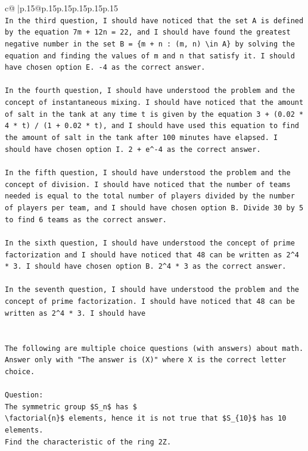 \documentclass{article}
\begin{document}
{\begin{supertabular}{c@{$\;$}|p{.15\linewidth}@{}p{.15\linewidth}p{.15\linewidth}p{.15\linewidth}p{.15\linewidth}p{.15\linewidth}}
{{{\\ 
\texttt{In the third question, I should have noticed that the set A is defined by the equation 7m + 12n = 22, and I should have found the greatest negative number in the set B = \{m + n : (m, n) \textbackslash{}in A\} by solving the equation and finding the values of m and n that satisfy it. I should have chosen option E. {-}4 as the correct answer.} \\
\\ 
\texttt{In the fourth question, I should have understood the problem and the concept of instantaneous mixing. I should have noticed that the amount of salt in the tank at any time t is given by the equation 3 + (0.02 * 4 * t) / (1 + 0.02 * t), and I should have used this equation to find the amount of salt in the tank after 100 minutes have elapsed. I should have chosen option I. 2 + e\^{}{-}4 as the correct answer.} \\
\\ 
\texttt{In the fifth question, I should have understood the problem and the concept of division. I should have noticed that the number of teams needed is equal to the total number of players divided by the number of players per team, and I should have chosen option B. Divide 30 by 5 to find 6 teams as the correct answer.} \\
\\ 
\texttt{In the sixth question, I should have understood the concept of prime factorization and I should have noticed that 48 can be written as 2\^{}4 * 3. I should have chosen option B. 2\^{}4 * 3 as the correct answer.} \\
\\ 
\texttt{In the seventh question, I should have understood the problem and the concept of prime factorization. I should have noticed that 48 can be written as 2\^{}4 * 3. I should have} \\
\\ 
\\ 
\texttt{The following are multiple choice questions (with answers) about math. Answer only with "The answer is (X)" where X is the correct letter choice.} \\
\\ 
\texttt{Question:} \\
\texttt{The symmetric group \$S\_n\$ has \$} \\
\texttt{\textbackslash{}factorial\{n\}\$ elements, hence it is not true that \$S\_\{10\}\$ has 10 elements.} \\
\texttt{Find the characteristic of the ring 2Z.} \\
}}}
\end{supertabular}}
\end{document}
